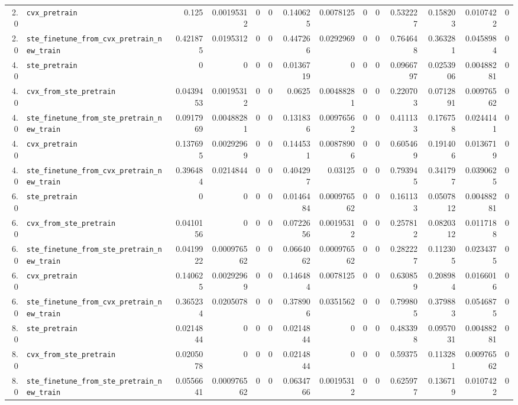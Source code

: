 \begin{longtable}{@{}r l *{12}{r}@{}}
2.0 & \texttt{cvx\_pretrain} & 0.125 & 0.00195312 & 0 & 0 & 0.140625 & 0.0078125 & 0 & 0 & 0.532227 & 0.158203 & 0.0107422 & 0 \\
2.0 & \texttt{ste\_finetune\_from\_cvx\_pretrain\_new\_train} & 0.421875 & 0.0195312 & 0 & 0 & 0.447266 & 0.0292969 & 0 & 0 & 0.764648 & 0.363281 & 0.0458984 & 0 \\
4.0 & \texttt{ste\_pretrain} & 0 & 0 & 0 & 0 & 0.0136719 & 0 & 0 & 0 & 0.0966797 & 0.0253906 & 0.00488281 & 0 \\
4.0 & \texttt{cvx\_from\_ste\_pretrain} & 0.0439453 & 0.00195312 & 0 & 0 & 0.0625 & 0.00488281 & 0 & 0 & 0.220703 & 0.0712891 & 0.00976562 & 0 \\
4.0 & \texttt{ste\_finetune\_from\_ste\_pretrain\_new\_train} & 0.0917969 & 0.00488281 & 0 & 0 & 0.131836 & 0.00976562 & 0 & 0 & 0.411133 & 0.176758 & 0.0244141 & 0 \\
4.0 & \texttt{cvx\_pretrain} & 0.137695 & 0.00292969 & 0 & 0 & 0.144531 & 0.00878906 & 0 & 0 & 0.605469 & 0.191406 & 0.0136719 & 0 \\
4.0 & \texttt{ste\_finetune\_from\_cvx\_pretrain\_new\_train} & 0.396484 & 0.0214844 & 0 & 0 & 0.404297 & 0.03125 & 0 & 0 & 0.793945 & 0.341797 & 0.0390625 & 0 \\
6.0 & \texttt{ste\_pretrain} & 0 & 0 & 0 & 0 & 0.0146484 & 0.000976562 & 0 & 0 & 0.161133 & 0.0507812 & 0.00488281 & 0 \\
6.0 & \texttt{cvx\_from\_ste\_pretrain} & 0.0410156 & 0 & 0 & 0 & 0.0722656 & 0.00195312 & 0 & 0 & 0.257812 & 0.0820312 & 0.0117188 & 0 \\
6.0 & \texttt{ste\_finetune\_from\_ste\_pretrain\_new\_train} & 0.0419922 & 0.000976562 & 0 & 0 & 0.0664062 & 0.000976562 & 0 & 0 & 0.282227 & 0.112305 & 0.0234375 & 0 \\
6.0 & \texttt{cvx\_pretrain} & 0.140625 & 0.00292969 & 0 & 0 & 0.146484 & 0.0078125 & 0 & 0 & 0.630859 & 0.208984 & 0.0166016 & 0 \\
6.0 & \texttt{ste\_finetune\_from\_cvx\_pretrain\_new\_train} & 0.365234 & 0.0205078 & 0 & 0 & 0.378906 & 0.0351562 & 0 & 0 & 0.799805 & 0.379883 & 0.0546875 & 0 \\
8.0 & \texttt{ste\_pretrain} & 0.0214844 & 0 & 0 & 0 & 0.0214844 & 0 & 0 & 0 & 0.483398 & 0.0957031 & 0.00488281 & 0 \\
8.0 & \texttt{cvx\_from\_ste\_pretrain} & 0.0205078 & 0 & 0 & 0 & 0.0214844 & 0 & 0 & 0 & 0.59375 & 0.113281 & 0.00976562 & 0 \\
8.0 & \texttt{ste\_finetune\_from\_ste\_pretrain\_new\_train} & 0.0556641 & 0.000976562 & 0 & 0 & 0.0634766 & 0.00195312 & 0 & 0 & 0.625977 & 0.136719 & 0.0107422 & 0 \\

\end{longtable}
